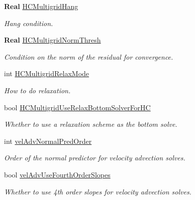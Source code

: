 \begin{DoxyCompactItemize}
\textbf{ Real} \hyperlink{struct_mushy_layer_options_ace155953d8c568fdf9a27762d6139d2c}{H\+C\+Multigrid\+Hang}
\begin{DoxyCompactList}\small\item\em Hang condition. \end{DoxyCompactList}\item 
\mbox{\label{struct_mushy_layer_options_abc8fe83852a42b5e6383edcd5969d6b8}} 
\textbf{ Real} \hyperlink{struct_mushy_layer_options_abc8fe83852a42b5e6383edcd5969d6b8}{H\+C\+Multigrid\+Norm\+Thresh}
\begin{DoxyCompactList}\small\item\em Condition on the norm of the residual for convergence. \end{DoxyCompactList}\item 
int \hyperlink{struct_mushy_layer_options_a8f5654eec8b54b68574513aba5d629cc}{H\+C\+Multigrid\+Relax\+Mode}
\begin{DoxyCompactList}\small\item\em How to do relaxation. \end{DoxyCompactList}\item 
bool \hyperlink{struct_mushy_layer_options_ab4b570de637aab8151bfb5b081768839}{H\+C\+Multigrid\+Use\+Relax\+Bottom\+Solver\+For\+HC}
\begin{DoxyCompactList}\small\item\em Whether to use a relaxation scheme as the bottom solve. \end{DoxyCompactList}\item 
\mbox{\label{struct_mushy_layer_options_ada6ee708d9641d293cd0a657f8c69b98}} 
int \hyperlink{struct_mushy_layer_options_ada6ee708d9641d293cd0a657f8c69b98}{vel\+Adv\+Normal\+Pred\+Order}
\begin{DoxyCompactList}\small\item\em Order of the normal predictor for velocity advection solves. \end{DoxyCompactList}\item 
\mbox{\label{struct_mushy_layer_options_a5346edd28b0f35e3cd26151fd8297ce1}} 
bool \hyperlink{struct_mushy_layer_options_a5346edd28b0f35e3cd26151fd8297ce1}{vel\+Adv\+Use\+Fourth\+Order\+Slopes}
\begin{DoxyCompactList}\small\item\em Whether to use 4th order slopes for velocity advection solves. \end{DoxyCompactList}\item 

\end{DoxyCompactItemize}
